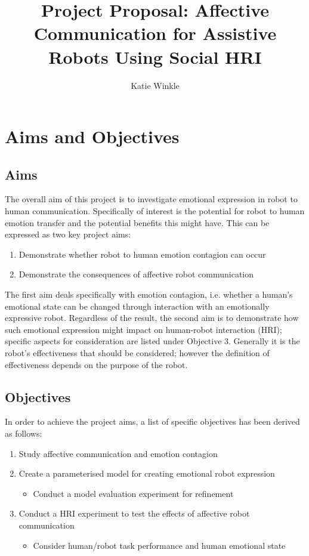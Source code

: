 \documentclass[11pt]{article}
\title{Project Proposal: Affective Communication for Assistive Robots Using Social HRI}
\author{Katie Winkle}
\begin{document}
\maketitle

\begin{abstract}

\end{abstract}

\section{Aims and Objectives}
\subsection{Aims}
The overall aim of this project is to investigate emotional expression in robot to human communication. Specifically of interest is the potential for robot to human emotion transfer and the potential benefits this might have. This can be expressed as two key project aims:

\begin{enumerate}
\item Demonstrate whether robot to human emotion contagion can occur
\item Demonstrate the consequences of affective robot communication
\end{enumerate}

The first aim deals specifically with emotion contagion, i.e. whether a human's emotional state can be changed through interaction with an emotionally expressive robot. Regardless of the result, the second aim is to demonstrate how such emotional expression might impact on human-robot interaction (HRI); specific aspects for consideration are listed under Objective 3. Generally it is the robot's effectiveness that should be considered; however the definition of effectiveness depends on the purpose of the robot. 

\subsection{Objectives}
In order to achieve the project aims, a list of specific objectives has been derived as follows: 
\begin{enumerate}
\item Study affective communication and emotion contagion
\item Create a parameterised model for creating emotional robot expression
\begin{itemize}
\item Conduct a model evaluation experiment for refinement
\end{itemize}
\item Conduct a HRI experiment to test the effects of affective robot communication
\begin{itemize}
\item Consider human/robot task performance and human emotional state
\end{itemize}
\end{enumerate}
\end{document}
